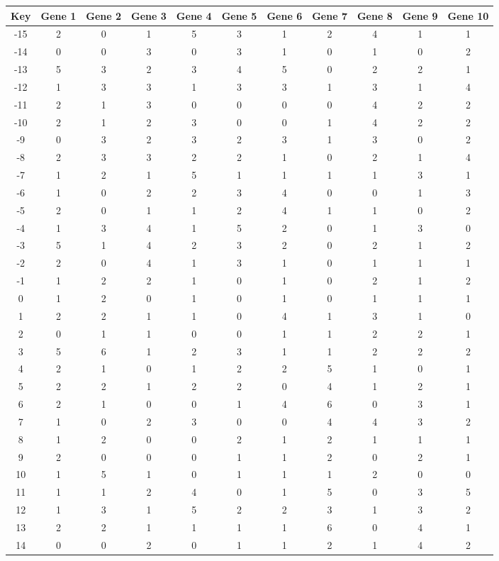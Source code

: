 \begin{tabular}{|c|c|c|c|c|c|c|c|c|c|c|}
\hline
Key & Gene 1 & Gene 2 & Gene 3 & Gene 4 & Gene 5 & Gene 6 & Gene 7 & Gene 8 & Gene 9 & Gene 10 \\
\hline
-15 & 2 & 0 & 1 & 5 & 3 & 1 & 2 & 4 & 1 & 1 \\
-14 & 0 & 0 & 3 & 0 & 3 & 1 & 0 & 1 & 0 & 2 \\
-13 & 5 & 3 & 2 & 3 & 4 & 5 & 0 & 2 & 2 & 1 \\
-12 & 1 & 3 & 3 & 1 & 3 & 3 & 1 & 3 & 1 & 4 \\
-11 & 2 & 1 & 3 & 0 & 0 & 0 & 0 & 4 & 2 & 2 \\
-10 & 2 & 1 & 2 & 3 & 0 & 0 & 1 & 4 & 2 & 2 \\
-9 & 0 & 3 & 2 & 3 & 2 & 3 & 1 & 3 & 0 & 2 \\
-8 & 2 & 3 & 3 & 2 & 2 & 1 & 0 & 2 & 1 & 4 \\
-7 & 1 & 2 & 1 & 5 & 1 & 1 & 1 & 1 & 3 & 1 \\
-6 & 1 & 0 & 2 & 2 & 3 & 4 & 0 & 0 & 1 & 3 \\
-5 & 2 & 0 & 1 & 1 & 2 & 4 & 1 & 1 & 0 & 2 \\
-4 & 1 & 3 & 4 & 1 & 5 & 2 & 0 & 1 & 3 & 0 \\
-3 & 5 & 1 & 4 & 2 & 3 & 2 & 0 & 2 & 1 & 2 \\
-2 & 2 & 0 & 4 & 1 & 3 & 1 & 0 & 1 & 1 & 1 \\
-1 & 1 & 2 & 2 & 1 & 0 & 1 & 0 & 2 & 1 & 2 \\
0 & 1 & 2 & 0 & 1 & 0 & 1 & 0 & 1 & 1 & 1 \\
1 & 2 & 2 & 1 & 1 & 0 & 4 & 1 & 3 & 1 & 0 \\
2 & 0 & 1 & 1 & 0 & 0 & 1 & 1 & 2 & 2 & 1 \\
3 & 5 & 6 & 1 & 2 & 3 & 1 & 1 & 2 & 2 & 2 \\
4 & 2 & 1 & 0 & 1 & 2 & 2 & 5 & 1 & 0 & 1 \\
5 & 2 & 2 & 1 & 2 & 2 & 0 & 4 & 1 & 2 & 1 \\
6 & 2 & 1 & 0 & 0 & 1 & 4 & 6 & 0 & 3 & 1 \\
7 & 1 & 0 & 2 & 3 & 0 & 0 & 4 & 4 & 3 & 2 \\
8 & 1 & 2 & 0 & 0 & 2 & 1 & 2 & 1 & 1 & 1 \\
9 & 2 & 0 & 0 & 0 & 1 & 1 & 2 & 0 & 2 & 1 \\
10 & 1 & 5 & 1 & 0 & 1 & 1 & 1 & 2 & 0 & 0 \\
11 & 1 & 1 & 2 & 4 & 0 & 1 & 5 & 0 & 3 & 5 \\
12 & 1 & 3 & 1 & 5 & 2 & 2 & 3 & 1 & 3 & 2 \\
13 & 2 & 2 & 1 & 1 & 1 & 1 & 6 & 0 & 4 & 1 \\
14 & 0 & 0 & 2 & 0 & 1 & 1 & 2 & 1 & 4 & 2 \\
\hline
\end{tabular}